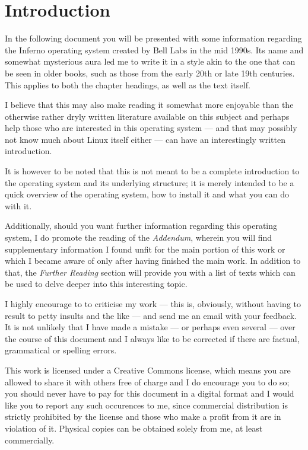\documentclass[a5paper,twoside,12pt]{report}
\begin{document}
\tableofcontents
\newpage

\chapter*{Introduction}
In the following document you will be presented with some information regarding the Inferno operating system created by Bell Labs in the mid 1990s. Its name and somewhat mysterious aura led me to write it in a style akin to the one that can be seen in older books, such as those from the early 20th or late 19th centuries. This applies to both the chapter headings, as well as the text itself.

I believe that this may also make reading it somewhat more enjoyable than the otherwise rather dryly written literature available on this subject and perhaps help those who are interested in this operating system — and that may possibly not know much about Linux itself either — can have an interestingly written introduction.

It is however to be noted that this is not meant to be a complete introduction to the operating system and its underlying structure; it is merely intended to be a quick overview of the operating system, how to install it and what you can do with it.

Additionally, should you want further information regarding this operating system, I do promote the reading of the \textit{Addendum}, wherein you will find supplementary information I found unfit for the main portion of this work or which I became aware of only after having finished the main work. In addition to that, the \textit{Further Reading} section will provide you with a list of texts which can be used to delve deeper into this interesting topic.

I highly encourage to to criticise my work — this is, obviously, without having to result to petty insults and the like — and send me an email with your feedback. It is not unlikely that I have made a mistake — or perhaps even several — over the course of this document and I always like to be corrected if there are factual, grammatical or spelling errors.

This work is licensed under a Creative Commons license, which means you are allowed to share it with others free of charge and I do encourage you to do so; you should never have to pay for this document in a digital format and I would like you to report any such occurences to me, since commercial distribution is strictly prohibited by the license and those who make a profit from it are in violation of it. Physical copies can be obtained solely from me, at least commercially. 
\end{document}
